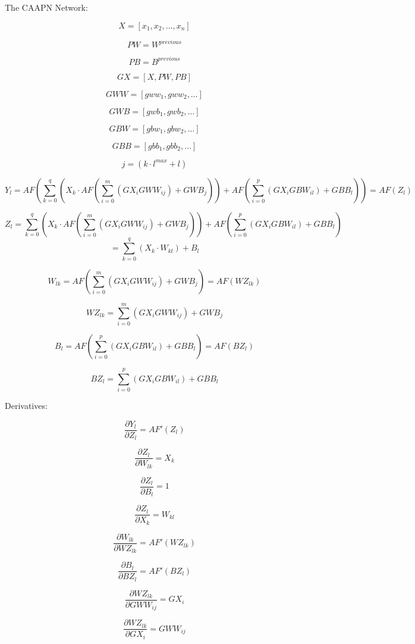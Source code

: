\documentclass[a4paper]{article}
\begin{document}
	

	The CAAPN Network:

	\[
	X=[x_1, x_2, \ldots, x_n]
	\]
	
	\[
	PW=W^{previous}
	\]
	
	\[
	PB=B^{previous}
	\]
	
	\[
	GX=[X, PW, PB]
	\]
	
	\[
	GWW=[gww_1, gww_2, \ldots]
	\]
	
	\[
	GWB=[gwb_1, gwb_2, \ldots]
	\]
	
	\[
	GBW=[gbw_1, gbw_2, \ldots]
	\]
	
	\[
	GBB=[gbb_1, gbb_2, \ldots]
	\]
	
	\[
	j=(k \cdot l^{max}+l)
	\]

	\[
	Y_l =AF\left(\sum_{k=0}^{q}\left(X_k \cdot AF\left(\sum_{i=0}^{m}\left(GX_iGWW_{ij}\right)+GWB_{j}\right)\right) + AF\left(\sum_{i=0}^{p}\left(GX_iGBW_{il}\right)+GBB_l\right)\right)=AF(Z_l)
	\]

	\[
	Z_l=\sum_{k=0}^{q}\left(X_k \cdot AF\left(\sum_{i=0}^{m}\left(GX_iGWW_{ij}\right)+GWB_{j}\right)\right) + AF\left(\sum_{i=0}^{p}\left(GX_iGBW_{il}\right)+GBB_l\right)
	\]
	\[
		=\sum_{k=0}^{q}\left(X_k \cdot W_{kl}\right) + B_{l}
	\]

	\[
	W_{lk} =  AF\left(\sum_{i=0}^{m}\left(GX_iGWW_{ij}\right)+GWB_{j}\right) = AF\left(WZ_{lk}\right)
	\]

	\[
	WZ_{lk} = \sum_{i=0}^{m}\left(GX_iGWW_{ij}\right)+GWB_{j}
	\]

	\[
	B_{l} = AF\left(\sum_{i=0}^{p}\left(GX_iGBW_{il}\right)+GBB_l\right) = AF\left(BZ_{l}\right)
	\]

	\[
	BZ_{l} = \sum_{i=0}^{p}\left(GX_iGBW_{il}\right)+GBB_l
	\]

	Derivatives:

	\[
	\frac{\partial Y_l}{\partial Z_l} = AF'(Z_l)
	\]

	\[
	\frac{\partial Z_l}{\partial W_{lk}} = X_k
	\]

	\[
	\frac{\partial Z_l}{\partial B_{l}} = 1
	\]

	\[
	\frac{\partial Z_l}{\partial X_k} = W_{kl}
	\]

	\[
	\frac{\partial W_{lk}}{\partial WZ_{lk}} = AF'(WZ_{lk})
	\]

	\[
	\frac{\partial B_{l}}{\partial BZ_{l}} = AF'(BZ_{l})
	\]

	\[
	\frac{\partial WZ_{lk}}{\partial GWW_{ij}} = GX_i
	\]

	\[
	\frac{\partial WZ_{lk}}{\partial GX_i} = GWW_{ij}
	\]
\end{document}
